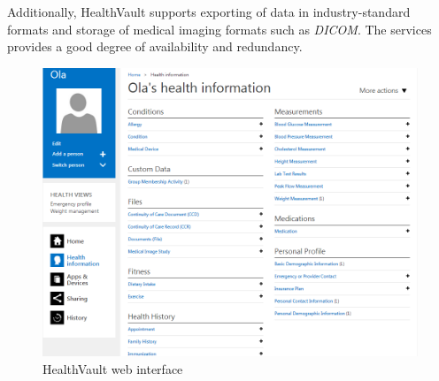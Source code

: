 Additionally, HealthVault supports exporting of data in industry-standard formats and storage of medical imaging formats such as \textit{DICOM}. 
The services provides a good degree of availability and redundancy. \cite{HealthVault}

\begin{figure}[h]
\begin{center}
\includegraphics[scale=0.50]{../Figures/hv-page.png}
\end{center}
\caption{HealthVault web interface}
\label{figure:hv-page}
\end{figure}

